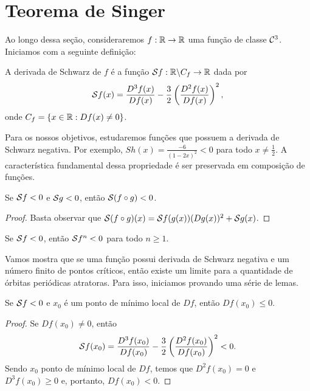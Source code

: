 \section{Teorema de Singer}

Ao longo dessa seção, consideraremos $f: \mathbb{R} \to \mathbb{R}$ uma função de classe $\mathcal{C}^3$. Iniciamos com a seguinte definição: 

\begin{definition}
A derivada de Schwarz de $f$ é a função $\mathcal{S} f: \mathbb{R} \backslash C_f \to \mathbb{R}$ dada por
$$\mathcal{S} f(x) = \frac{D^3 f(x)}{D f(x)} - \frac{3}{2} \left( \frac{D^2 f(x)}{D f(x)} \right)^2,$$
onde $C_f = \lbrace x \in \mathbb{R}: Df(x) \neq 0 \rbrace$.
\end{definition}

Para os nossos objetivos, estudaremos funções que possuem a derivada de Schwarz negativa. Por exemplo, $Sh(x) = \frac{-6}{(1 - 2x)^2} < 0$ para todo $x \neq \frac{1}{2}$. A característica fundamental dessa propriedade é ser preservada em composição de funções.

\begin{proposition}
Se $\mathcal{S} f < 0$ e $\mathcal{S} g < 0$, então $\mathcal{S} (f \circ g) < 0$.
\end{proposition}

\begin{proof}
Basta observar que $\mathcal{S} (f \circ g)(x) = \mathcal{S} f(g(x))(D g(x))^2 + \mathcal{S} g(x)$.
\end{proof}

\begin{corollary}
Se $\mathcal{S} f < 0$, então $\mathcal{S} f^n < 0$ para todo $n \geq 1$.
\end{corollary}

Vamos mostra que se uma função possui derivada de Schwarz negativa e um número finito de pontos críticos, então existe um limite para a quantidade de órbitas periódicas atratoras. Para isso, iniciamos provando uma série de lemas.

\begin{lemma}\label{lem 10-1}
Se $\mathcal{S} f < 0$ e $x_0$ é um ponto de mínimo local de $D f$, então $D f(x_0) \leq 0$.
\end{lemma}

\begin{proof}
Se $D f(x_0) \neq 0$, então
$$\mathcal{S} f(x_0) = \frac{D^3 f(x_0)}{D f(x_0)} - \frac{3}{2} \left( \frac{D^2 f(x_0)}{D f(x_0)} \right)^2 < 0.$$
Sendo $x_0$ ponto de mínimo local de $D f$, temos que $D^2 f(x_0) = 0$ e $D^3 f(x_0) \geq 0$ e, portanto, $D f(x_0) < 0$. 
\end{proof}

